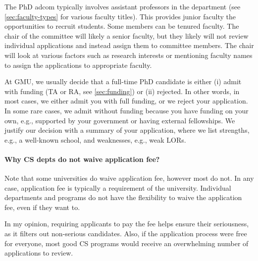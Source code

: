 \documentclass[oneside,11pt]{memoir}
\newenvironment{commentbox}[1][]{
  \small
  \begin{mybox}
    {\small \textbf{#1}}
  }{
  \end{mybox}
}
\newcommand{\mycomment}[3][\color{blue}]{{#1{{#2}: {#3}}}}
\newcommand{\didi}[1]{\mycomment{Didier}{#1}}{}
\begin{document}
The PhD adcom typically involves assistant professors in the department (see \autoref{sec:faculty-types} for various faculty titles). This provides junior faculty the opportunities to recruit students. Some members can be tenured faculty. The chair of the committee will likely a senior faculty, but they likely will not review individual applications and instead assign them to committee members. The chair will look at various factors such as research interests or mentioning faculty names to assign the applications to appropriate faculty.

At GMU, we usually decide that a full-time PhD candidate is either (i) admit with funding (TA or RA, see \autoref{sec:funding}) or (ii) rejected. In other words, in most cases, we either
admit you with full funding, or we reject your application. In some rare cases, we admit
without funding because you have funding on your own, e.g.,
supported by your government or having external fellowships. We justify
our decision with a summary of your application, where we list
strengths, e.g., a well-known school, and weaknesses, e.g., weak
LORs.



\paragraph{Why CS depts do not waive application fee?}  Note that some universities do waive application fee, however most do not.  In any case, application fee is typically a requirement of the university. Individual departments and programs do not have the flexibility to waive the application fee, even if they want to. 

In my opinion, requiring applicants to pay the fee helps ensure their seriousness, as it filters out non-serious candidates. Also, if the application process were free for everyone, most good CS programs would receive an overwhelming number of applications to review.


\end{document}
